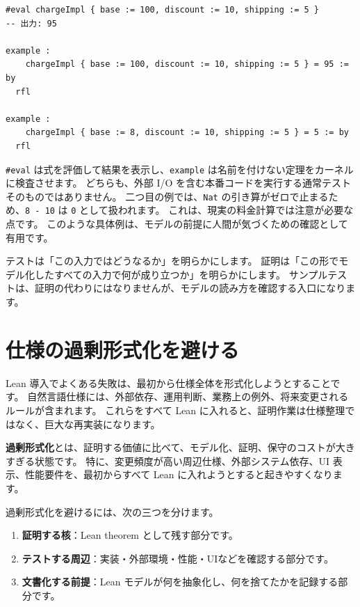 \begin{listing}[htbp]
\begin{verbatim}
#eval chargeImpl { base := 100, discount := 10, shipping := 5 }
-- 出力: 95

example :
    chargeImpl { base := 100, discount := 10, shipping := 5 } = 95 := by
  rfl

example :
    chargeImpl { base := 8, discount := 10, shipping := 5 } = 5 := by
  rfl
\end{verbatim}
\caption{\texttt{chargeImpl}}
\label{lst:ch35-charge-examples}
\end{listing}

\texttt{\#eval} は式を評価して結果を表示し、\texttt{example} は名前を付けない定理をカーネルに検査させます。
どちらも、外部 I/O を含む本番コードを実行する通常テストそのものではありません。
二つ目の例では、\texttt{Nat} の引き算がゼロで止まるため、\texttt{8 - 10} は \texttt{0} として扱われます。
これは、現実の料金計算では注意が必要な点です。
このような具体例は、モデルの前提に人間が気づくための確認として有用です。

テストは「この入力ではどうなるか」を明らかにします。
証明は「この形でモデル化したすべての入力で何が成り立つか」を明らかにします。
サンプルテストは、証明の代わりにはなりませんが、モデルの読み方を確認する入口になります。

\section{仕様の過剰形式化を避ける}

Lean 導入でよくある失敗は、最初から仕様全体を形式化しようとすることです。
自然言語仕様には、外部依存、運用判断、業務上の例外、将来変更されるルールが含まれます。
これらをすべて Lean に入れると、証明作業は仕様整理ではなく、巨大な再実装になります。

\textbf{過剰形式化}とは、証明する価値に比べて、モデル化、証明、保守のコストが大きすぎる状態です。
特に、変更頻度が高い周辺仕様、外部システム依存、UI 表示、性能要件を、最初からすべて Lean に入れようとすると起きやすくなります。

過剰形式化を避けるには、次の三つを分けます。

\begin{enumerate}
\item \textbf{証明する核}：Lean theorem として残す部分です。
\item \textbf{テストする周辺}：実装・外部環境・性能・UIなどを確認する部分です。
\item \textbf{文書化する前提}：Lean モデルが何を抽象化し、何を捨てたかを記録する部分です。
\end{enumerate}

